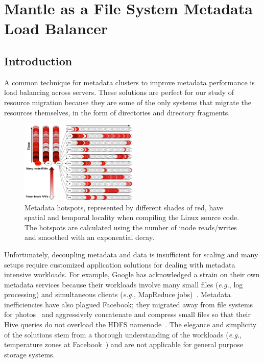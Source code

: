 \chapter{Mantle as a File System Metadata Load Balancer}
\label{mantle}

\section{Introduction}								    %
\label{introduction}								    %
A common technique for
metadata clusters to improve metadata performance is load balancing across
servers. These solutions are perfect for our study of resource migration
because they are some of the only systems that migrate the resources
themselves, in the form of directories and directory fragments. 



\begin{figure}[tb]
	\centering	
	\includegraphics[width=0.5\textwidth]{./chapters/mantle/figures/workload-tar.png}
	\caption{Metadata hotspots, represented by different shades of red, have spatial and temporal locality when compiling the Linux source code. The hotspots are calculated using the number of inode reads/writes and smoothed with an exponential decay. \label{figure:workload-tar}}
\end{figure}

Unfortunately, decoupling metadata and data is insufficient for scaling and many setups require customized application solutions for dealing with metadata intensive workloads. For example, Google has acknowledged a strain on their own metadata services because their workloads involve many small files ({\it e.g.}, log processing) and simultaneous clients ({\it e.g.}, MapReduce jobs)~\cite{mckusick:acm2010-gfs-evolution}. Metadata inefficiencies have also plagued Facebook; they migrated away from file systems for photos~\cite{beaver:osdi2010-haystack} and aggressively concatenate and compress small files so that their Hive queries do not overload the HDFS namenode~\cite{thusoo:sigmod2010-facebook-infrastructure}. The elegance and simplicity of the solutions stem from a thorough understanding of the workloads ({\it e.g.}, temperature zones at Facebook~\cite{muralidhar:osdi2014-f4}) and are not applicable for general purpose storage systems. 

